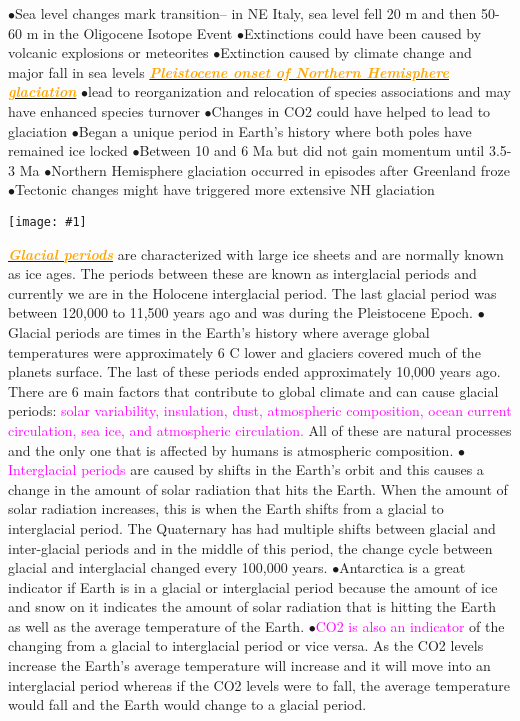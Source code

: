 \documentclass{article}
\newcommand{\ddd}{$\bullet$}
\newcommand{\pink}[1]{\textcolor{magenta}{#1}}
\newcommand{\orange}[1]{\textcolor{orange}{#1}}
\newcommand{\mysub}[1]{\underline{\textbf{{\textit{\orange{#1}}}}}}
\newcommand{\vocab}[1]{{\pink{#1}}}
\newcommand{\fig}[1]{
	\texttt{[image: \#1]}
}
\begin{document}
\begin{multicols*}{4}
            \ddd Sea level changes mark transition-- in NE Italy, sea level fell 20 m and then 50-60 m in the Oligocene Isotope Event
            \ddd Extinctions could have been caused by volcanic explosions or meteorites
            \ddd Extinction caused by climate change and major fall in sea levels
        \mysub{Pleistocene onset of Northern Hemisphere glaciation}
            \ddd lead to reorganization and relocation of species associations and may have enhanced species turnover
            \ddd Changes in CO2 could have helped to lead to glaciation
            \ddd Began a unique period in Earth’s history where both poles have remained ice locked
            \ddd Between 10 and 6 Ma but did not gain momentum until 3.5-3 Ma
            \ddd Northern Hemisphere glaciation occurred in episodes after Greenland froze
            \ddd Tectonic changes might have triggered more extensive NH glaciation
        \fig{ice_ages1}
        \mysub{Glacial periods} are characterized with large ice sheets and are normally known as ice ages. The periods between these are known as interglacial periods and currently we are in the Holocene interglacial period. The last glacial period was between 120,000 to 11,500 years ago and was during the Pleistocene Epoch.
        \ddd Glacial periods are times in the Earth's history where average global temperatures were approximately 6 C lower and glaciers covered much of the planets surface. The last of these periods ended approximately 10,000 years ago. There are 6 main factors that contribute to global climate and can cause glacial periods: \vocab{solar variability, insulation, dust, atmospheric composition, ocean current circulation, sea ice, and atmospheric circulation.} All of these are natural processes and the only one that is affected by humans is atmospheric composition.
        \ddd \vocab{Interglacial periods} are caused by shifts in the Earth's orbit and this causes a change in the amount of solar radiation that hits the Earth. When the amount of solar radiation increases, this is when the Earth shifts from a glacial to interglacial period. The Quaternary has had multiple shifts between glacial and inter-glacial periods and in the middle of this period, the change cycle between glacial and interglacial changed every 100,000 years. 
        \ddd Antarctica is a great indicator if Earth is in a glacial or interglacial period because the amount of ice and snow on it indicates the amount of solar radiation that is hitting the Earth as well as the average temperature of the Earth.
        \ddd \vocab{CO2 is also an indicator} of the changing from a glacial to interglacial period or vice versa. As the CO2 levels increase the Earth's average temperature will increase and it will move into an interglacial period whereas if the CO2 levels were to fall, the average temperature would fall and the Earth would change to a glacial period.

\end{multicols*}
\end{document}
